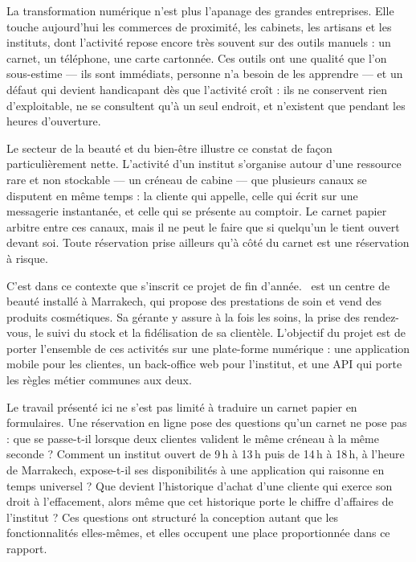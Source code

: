 
La transformation numérique n'est plus l'apanage des grandes entreprises. Elle
touche aujourd'hui les commerces de proximité, les cabinets, les artisans et
les instituts, dont l'activité repose encore très souvent sur des outils
manuels : un carnet, un téléphone, une carte cartonnée. Ces outils ont une
qualité que l'on sous-estime --- ils sont immédiats, personne n'a besoin de les
apprendre --- et un défaut qui devient handicapant dès que l'activité croît :
ils ne conservent rien d'exploitable, ne se consultent qu'à un seul endroit, et
n'existent que pendant les heures d'ouverture.

Le secteur de la beauté et du bien-être illustre ce constat de façon
particulièrement nette. L'activité d'un institut s'organise autour d'une
ressource rare et non stockable --- un créneau de cabine --- que plusieurs
canaux se disputent en même temps : la cliente qui appelle, celle qui écrit sur
une messagerie instantanée, et celle qui se présente au comptoir. Le carnet
papier arbitre entre ces canaux, mais il ne peut le faire que si quelqu'un le
tient ouvert devant soi. Toute réservation prise ailleurs qu'à côté du carnet
est une réservation à risque.

C'est dans ce contexte que s'inscrit ce projet de fin d'année. \yani\ est un
centre de beauté installé à Marrakech, qui propose des prestations de soin et
vend des produits cosmétiques. Sa gérante y assure à la fois les soins, la
prise des rendez-vous, le suivi du stock et la fidélisation de sa clientèle.
L'objectif du projet est de porter l'ensemble de ces activités sur une
plate-forme numérique : une application mobile pour les clientes, un
back-office web pour l'institut, et une API qui porte les règles métier
communes aux deux.

Le travail présenté ici ne s'est pas limité à traduire un carnet papier en
formulaires. Une réservation en ligne pose des questions qu'un carnet ne pose
pas : que se passe-t-il lorsque deux clientes valident le même créneau à la
même seconde ? Comment un institut ouvert de 9\,h à 13\,h puis de 14\,h à
18\,h, à l'heure de Marrakech, expose-t-il ses disponibilités à une
application qui raisonne en temps universel ? Que devient l'historique
d'achat d'une cliente qui exerce son droit à l'effacement, alors même que cet
historique porte le chiffre d'affaires de l'institut ? Ces questions ont
structuré la conception autant que les fonctionnalités elles-mêmes, et elles
occupent une place proportionnée dans ce rapport.

